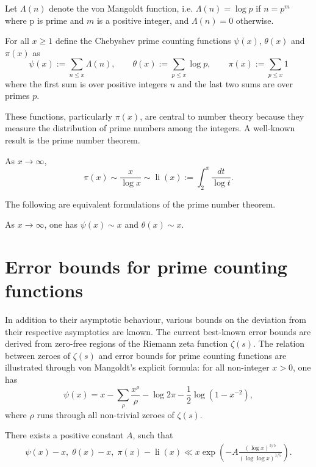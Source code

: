 Let $\Lambda(n)$ denote the von Mangoldt function, i.e. $\Lambda(n) = \log p$ if $n = p^m$ where p is prime and $m$ is a positive integer, and $\Lambda(n) = 0$ otherwise.

\begin{definition}
For all $x \ge 1$ define the Chebyshev prime counting functions $\psi(x)$, $\theta(x)$ and $\pi(x)$ as
\[
\psi(x) := \sum_{n \le x}\Lambda(n),\qquad \theta(x) := \sum_{p \le x}\log p,\qquad \pi(x) := \sum_{p \le x}1
\]
where the first sum is over positive integers $n$ and the last two sums are over primes $p$.
\end{definition}

These functions, particularly $\pi(x)$, are central to number theory because they measure the distribution of prime numbers among the integers. A well-known result is the prime number theorem.

\begin{theorem}
As $x \to \infty$,
\[
\pi(x) \sim \frac{x}{\log x} \sim \operatorname{li}(x) := \int_2^{x}\frac{dt}{\log t}.
\]
\end{theorem}

The following are equivalent formulations of the prime number theorem.

\begin{theorem}
As $x \to \infty$, one has $\psi(x) \sim x$ and $\theta(x) \sim x$.
\end{theorem}

\section{Error bounds for prime counting functions}
In addition to their asymptotic behaviour, various bounds on the deviation from their respective asymptotics are known. The current best-known error bounds are derived from zero-free regions of the Riemann zeta function $\zeta(s)$. The relation between zeroes of $\zeta(s)$ and error bounds for prime counting functions are illustrated through von Mangoldt's explicit formula: for all non-integer $x > 0$, one has
\[
\psi(x) = x - \sum_{\rho}\frac{x^\rho}{\rho} - \log 2\pi - \frac{1}{2}\log(1 - x^{-2}),
\]
where $\rho$ runs through all non-trivial zeroes of $\zeta(s)$.

\begin{theorem}
There exists a positive constant $A$, such that
\begin{align*}
\psi(x) - x, \; \theta(x) - x, \; \pi(x) - \operatorname{li}(x) \ll x\exp\left(-A\frac{(\log x)^{3/5}}{(\log\log x)^{1/5}}\right).
\end{align*}
\end{theorem}

